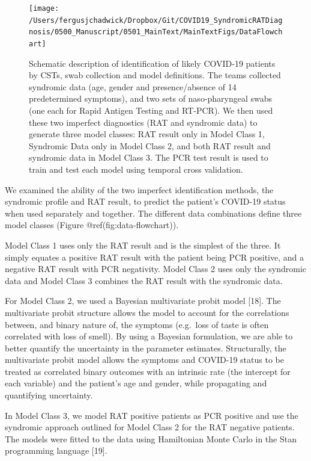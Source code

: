 \documentclass[]{elsarticle} %
\begin{document}
\begin{figure}
\texttt{[image: /Users/fergusjchadwick/Dropbox/Git/COVID19\_SyndromicRATDiagnosis/0500\_Manuscript/0501\_MainText/MainTextFigs/DataFlowchart]} \caption{Schematic description of identification of likely COVID-19 patients by CSTs, swab collection and model definitions. The teams collected syndromic data (age, gender and presence/absence of 14 predetermined symptoms), and two sets of naso-pharyngeal swabs (one each for Rapid Antigen Testing and RT-PCR). We then used these two imperfect diagnostics (RAT and syndromic data) to generate three model classes: RAT result only in Model Class 1, Syndromic Data only in Model Class 2, and both RAT result and syndromic data in Model Class 3. The PCR test result is used to train and test each model using temporal cross validation.}\label{fig:data-flowchart}
\end{figure}

We examined the ability of the two imperfect identification methods, the
syndromic profile and RAT result, to predict the patient's COVID-19
status when used separately and together. The different data
combinations define three model classes (Figure
@ref(fig:data-flowchart)).

Model Class 1 uses only the RAT result and is the simplest of the three.
It simply equates a positive RAT result with the patient being PCR
positive, and a negative RAT result with PCR negativity. Model Class 2
uses only the syndromic data and Model Class 3 combines the RAT result
with the syndromic data.

For Model Class 2, we used a Bayesian multivariate probit model
{[}18{]}. The multivariate probit structure allows the model to account
for the correlations between, and binary nature of, the symptoms
(e.g.~loss of taste is often correlated with loss of smell). By using a
Bayesian formulation, we are able to better quantify the uncertainty in
the parameter estimates. Structurally, the multivariate probit model
allows the symptoms and COVID-19 status to be treated as correlated
binary outcomes with an intrinsic rate (the intercept for each variable)
and the patient's age and gender, while propagating and quantifying
uncertainty.

In Model Class 3, we model RAT positive patients as PCR positive and use
the syndromic approach outlined for Model Class 2 for the RAT negative
patients. The models were fitted to the data using Hamiltonian Monte
Carlo in the Stan programming language {[}19{]}.
\end{document}
